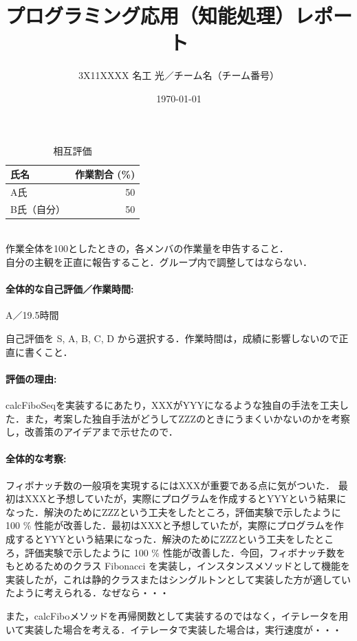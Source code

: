 \documentclass[10pt,a4j]{ujarticle} %
\title{プログラミング応用（知能処理）レポート}
\author{
 3X11XXXX 名工 光／チーム名（チーム番号）\\
}
\date{\today}
\begin{document}
\maketitle

\begin{table}[h]
\center
\caption{相互評価}
\begin{tabular}{l|r}
氏名 & 作業割合 (\%) \\
\hline \hline
A氏 & 50\\
B氏（自分）& 50
\end{tabular}
\vspace{1ex}
\\
{\small 作業全体を100としたときの，各メンバの作業量を申告すること．\\
自分の主観を正直に報告すること．グループ内で調整してはならない．}
\end{table}

\paragraph{全体的な自己評価／作業時間: } A／19.5時間

自己評価を S, A, B, C, D から選択する．作業時間は，成績に影響しないので正直に書くこと．

\paragraph{評価の理由: } calcFiboSeqを実装するにあたり，XXXがYYYになるような独自の手法を工夫した．また，考案した独自手法がどうしてZZZのときにうまくいかないのかを考察し，改善策のアイデアまで示せたので．

\paragraph{全体的な考察: } フィボナッチ数の一般項を実現するにはXXXが重要である点に気がついた．
最初はXXXと予想していたが，実際にプログラムを作成するとYYYという結果になった．解決のためにZZZという工夫をしたところ，評価実験で示したように 100 \% 性能が改善した．最初はXXXと予想していたが，実際にプログラムを作成するとYYYという結果になった．解決のためにZZZという工夫をしたところ，評価実験で示したように 100 \% 性能が改善した．今回，フィボナッチ数をもとめるためのクラス Fibonacci を実装し，インスタンスメソッドとして機能を実装したが，これは静的クラスまたはシングルトンとして実装した方が適していたように考えられる．なぜなら・・・

また，calcFiboメソッドを再帰関数として実装するのではなく，イテレータを用いて実装した場合を考える．イテレータで実装した場合は，実行速度が・・・
\end{document}
